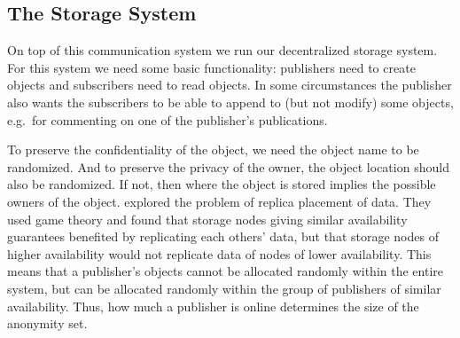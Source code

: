 
\subsection{The Storage System}\label{UnderlyingStorage}

On top of this communication system we run our decentralized storage system.
For this system we need some basic functionality:
publishers need to create objects and subscribers need to read objects.
In some circumstances the publisher also wants the subscribers to be able to 
append to (but not modify) some objects, e.g.\ for commenting on one of the 
publisher's publications.

To preserve the confidentiality of the object, we need the object name to be 
randomized.
And to preserve the privacy of the owner, the object location should also be 
randomized.
If not, then where the object is stored implies the possible owners of the 
object.
\citet{DataAvailability} explored the problem of replica placement of data.
They used game theory and found that storage nodes giving similar availability 
guarantees benefited by replicating each others' data, but that storage nodes 
of higher availability would not replicate data of nodes of lower availability.
This means that a publisher's objects cannot be allocated randomly within the 
entire system, but can be allocated randomly within the group of publishers of 
similar availability.
Thus, how much a publisher is online determines the size of the anonymity set.

